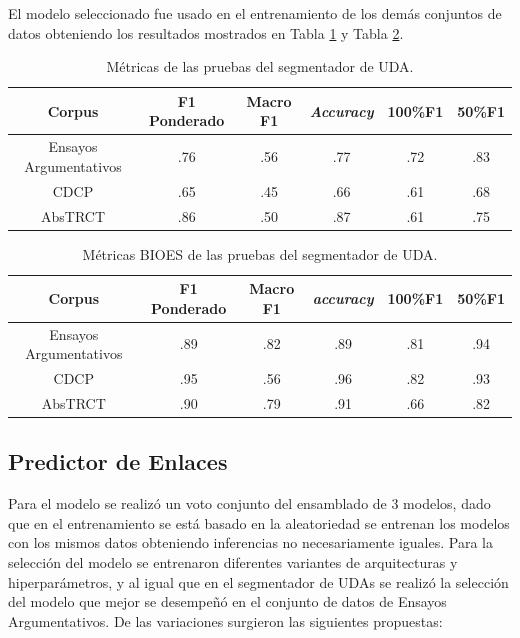 El modelo seleccionado fue usado en el entrenamiento de los demás conjuntos de datos obteniendo los resultados mostrados
en Tabla \ref{table:test_metrics_segmenter} y Tabla \ref{table:test_bioes_metrics_segmenter}.

\begin{table}[h!]
	\begin{center}
		\begin{tabular}{|c|c|c|c|c|c|} \hline
        Corpus		            & F1 Ponderado  & Macro F1	& \emph{Accuracy} & 100\%F1 & 50\%F1  	   \\ \hline
        Ensayos Argumentativos  & .76           & .56 		& .77		      & .72	    & .83	       \\ \hline
        CDCP		            & .65           & .45 		& .66		      & .61	    & .68	       \\ \hline
        AbsTRCT	                & .86           & .50 		& .87		      & .61	    & .75	       \\ \hline
        \end{tabular}
	\caption{Métricas de las pruebas del segmentador de UDA.}\label{table:test_metrics_segmenter}
	\end{center}
\end{table}
\begin{table}[h!]
	\begin{center}
		\begin{tabular}{|c|c|c|c|c|c|} \hline
        Corpus		            & F1 Ponderado  & Macro F1 & \emph{accuracy} & 100\%F1 &  50\%F1   \\ \hline
        Ensayos Argumentativos  & .89           & .82	   & .89             & .81	   & .94 	   \\ \hline
        CDCP		            & .95           & .56	   & .96	         & .82	   & .93 	   \\ \hline
        AbsTRCT	                & .90           & .79	   & .91	         & .66	   & .82 	   \\ \hline
        \end{tabular}
	\caption{Métricas BIOES de las pruebas del segmentador de UDA.}\label{table:test_bioes_metrics_segmenter}
	\end{center}
\end{table}

\subsection{Predictor de Enlaces}

Para el modelo se realizó un voto conjunto del ensamblado de 3 modelos, dado que en el entrenamiento se 
está basado en la aleatoriedad se entrenan los modelos con los mismos datos obteniendo inferencias no
necesariamente iguales.
Para la selección del modelo se entrenaron diferentes variantes de arquitecturas y hiperparámetros, y 
al igual que en el segmentador de UDAs se realizó la selección del modelo que mejor se desempeñó en 
el conjunto de datos de Ensayos Argumentativos. De las variaciones surgieron las siguientes propuestas:


